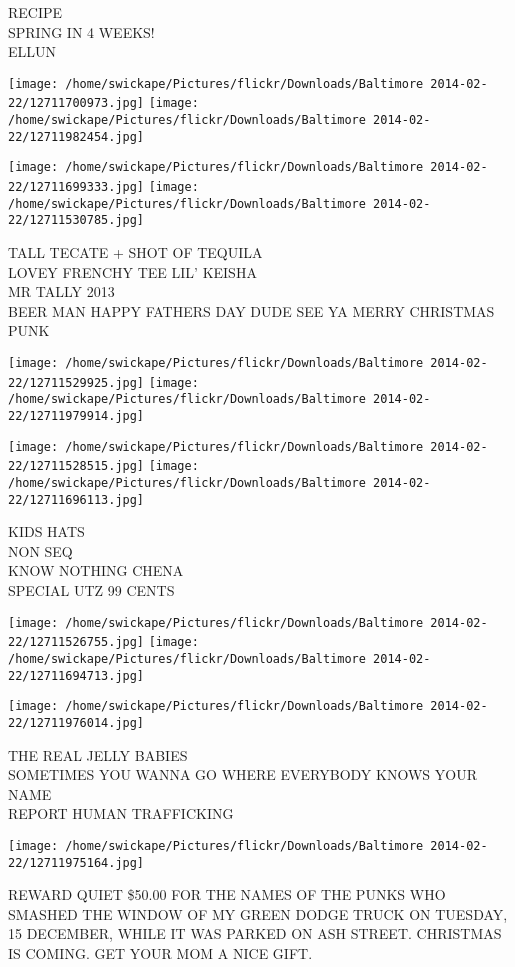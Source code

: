 \documentclass[10pt,letterpaper]{article}
\begin{document}
RECIPE\\
SPRING IN 4 WEEKS!\\
ELLUN\\
\pagebreak

\texttt{[image: /home/swickape/Pictures/flickr/Downloads/Baltimore 2014-02-22/12711700973.jpg]}
\texttt{[image: /home/swickape/Pictures/flickr/Downloads/Baltimore 2014-02-22/12711982454.jpg]}

\texttt{[image: /home/swickape/Pictures/flickr/Downloads/Baltimore 2014-02-22/12711699333.jpg]}
\texttt{[image: /home/swickape/Pictures/flickr/Downloads/Baltimore 2014-02-22/12711530785.jpg]}

TALL TECATE + SHOT OF TEQUILA\\
LOVEY FRENCHY TEE LIL' KEISHA\\
MR TALLY 2013\\
BEER MAN HAPPY FATHERS DAY DUDE SEE YA MERRY CHRISTMAS PUNK\\
\pagebreak

\texttt{[image: /home/swickape/Pictures/flickr/Downloads/Baltimore 2014-02-22/12711529925.jpg]}
\texttt{[image: /home/swickape/Pictures/flickr/Downloads/Baltimore 2014-02-22/12711979914.jpg]}

\texttt{[image: /home/swickape/Pictures/flickr/Downloads/Baltimore 2014-02-22/12711528515.jpg]}
\texttt{[image: /home/swickape/Pictures/flickr/Downloads/Baltimore 2014-02-22/12711696113.jpg]}

KIDS HATS\\
NON SEQ\\
KNOW NOTHING CHENA\\
SPECIAL UTZ 99 CENTS\\
\pagebreak

\texttt{[image: /home/swickape/Pictures/flickr/Downloads/Baltimore 2014-02-22/12711526755.jpg]}
\texttt{[image: /home/swickape/Pictures/flickr/Downloads/Baltimore 2014-02-22/12711694713.jpg]}

\vspace{0.25in}
\texttt{[image: /home/swickape/Pictures/flickr/Downloads/Baltimore 2014-02-22/12711976014.jpg]}

THE REAL JELLY BABIES\\
SOMETIMES YOU WANNA GO WHERE EVERYBODY KNOWS YOUR NAME\\
REPORT HUMAN TRAFFICKING\\
\pagebreak

\texttt{[image: /home/swickape/Pictures/flickr/Downloads/Baltimore 2014-02-22/12711975164.jpg]}

REWARD QUIET \$50.00 FOR THE NAMES OF THE PUNKS WHO SMASHED THE WINDOW OF MY GREEN DODGE TRUCK ON TUESDAY, 15 DECEMBER, WHILE IT WAS PARKED ON ASH STREET.  CHRISTMAS IS COMING.  GET YOUR MOM A NICE GIFT.\\
\pagebreak
\end{document}
